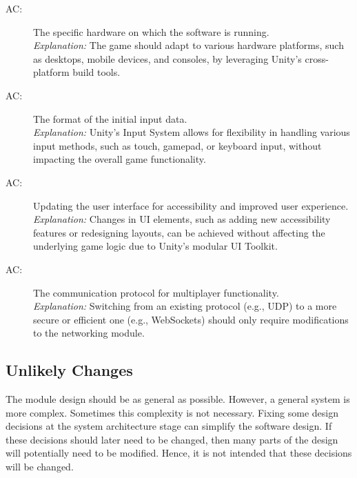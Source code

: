 \documentclass[12pt, titlepage]{article}
\newcounter{acnum}
\newcommand{\actheacnum}{AC\theacnum}
\begin{document}
\begin{description}
\item[ \actheacnum \label{acHardware}:] The specific
  hardware on which the software is running. \\
  \textit{Explanation:} The game should adapt to various hardware platforms, such as desktops, mobile devices, and consoles, by leveraging Unity's cross-platform build tools.
  
\item[ \actheacnum \label{acInput}:] The format of the
  initial input data. \\
  \textit{Explanation:} Unity's Input System allows for flexibility in handling various input methods, such as touch, gamepad, or keyboard input, without impacting the overall game functionality.
  
\item[ \actheacnum \label{acUI}:] Updating the user interface for accessibility and improved user experience. \\
  \textit{Explanation:} Changes in UI elements, such as adding new accessibility features or redesigning layouts, can be achieved without affecting the underlying game logic due to Unity's modular UI Toolkit.

\item[ \actheacnum \label{acNetwork}:] The communication protocol for multiplayer functionality. \\
  \textit{Explanation:} Switching from an existing protocol (e.g., UDP) to a more secure or efficient one (e.g., WebSockets) should only require modifications to the networking module.
\end{description}


\subsection{Unlikely Changes} \label{SecUchange}

The module design should be as general as possible. However, a general system is
more complex. Sometimes this complexity is not necessary. Fixing some design
decisions at the system architecture stage can simplify the software design. If
these decisions should later need to be changed, then many parts of the design
will potentially need to be modified. Hence, it is not intended that these
decisions will be changed.
\end{document}

